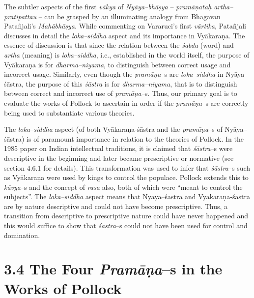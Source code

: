 The subtler aspects of the first \textit{vākya} of \textit{Nyāya–bhāṣya }– \textit{pramāṇataḥ artha–pratipattau} – can be grasped by an illuminating analogy from Bhagavān Patañjali’s \textit{Mahābhāṣya}. While commenting on Vararuci's first \textit{vārtika}, Patañjali discusses in detail the \textit{loka–siddha} aspect and its importance in Vyākaraṇa. The essence of discussion is that since the relation between the \textit{śabda} (word) and \textit{artha} (meaning) is \textit{loka–siddha}, i.e., established in the world itself, the purpose of Vyākaraṇa is for \textit{dharma–niyama}, to distinguish between correct usage and incorrect usage. Similarly, even though the \textit{pramāṇa–}s are \textit{loka–siddha} in Nyāya–śāstra, the purpose of this \textit{śāstra} is for \textit{dharma–niyama}, that is to distinguish between correct and incorrect use of \textit{pramāṇa–}s. Thus, our primary goal is to evaluate the works of Pollock to ascertain in order if the \textit{pramāṇa–}s are correctly being used to substantiate various theories.

The \textit{loka–siddha} aspect (of both Vyākaraṇa-śāstra and the \textit{pramāṇa–}s of Nyāya–śāstra) is of paramount importance in relation to the theories of Pollock. In the 1985 paper on Indian intellectual traditions, it is claimed that \textit{śāstra}–s were descriptive in the beginning and later became prescriptive or normative (see section 4.6.1 for details). This transformation was used to infer that \textit{śāstra}–s such as Vyākaraṇa were used by kings to control the populace. Pollock extends this to \textit{kāvya}–s and the concept of \textit{rasa} also, both of which were “meant to control the subjects”. The \textit{loka–siddha }aspect means that Nyāya–śāstra and Vyākaraṇa-śāstra are by nature descriptive and could not have become prescriptive. Thus, a transition from descriptive to prescriptive nature could have never happened and this would suffice to show that \textit{śāstra}–s could not have been used for control and domination.


\section*{3.4 The Four \textit{Pramāṇa}–s in the Works of Pollock}


